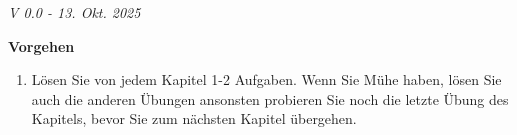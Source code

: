 

\renewcommand{\bbwAufgabenBlockID}{GLS}

\ifisNURAUFGABEN
\newcommand{\LoesungsBlock}[1]{\TRAINER{Lösung:#1
\vspace{1mm}
\hrule}}%
\else
\newcommand{\LoesungsBlock}[1]{\noTRAINER{\TNTeop{}}\TRAINER{Lösung:\,\,\,\,#1
\vspace{1mm}
\hrule}}%
\fi

\usepackage{amssymb} %
\renewcommand{\metaHeaderLine}{Arbeitsblatt Gleichungssysteme}
\renewcommand{\arbeitsblattTitel}{Lineare Gleichungssysteme}

\newcommand{\TNTeopS}[1]{\TRAINER{#1}\noTRAINER{\TNTeop{}}}

\arbeitsblattHeader{}

\begin{center}\textit{\tiny{V 0.0 - 13. Okt. 2025}}\end{center}

\tableofcontents{}

\newpage


\textbf{Vorgehen}


\begin{enumerate}
\item 
Lösen Sie von jedem Kapitel 1-2 Aufgaben. Wenn Sie Mühe haben, lösen
Sie auch die anderen Übungen ansonsten probieren Sie noch die letzte
Übung des Kapitels, bevor Sie zum nächsten Kapitel übergehen.
\end{enumerate}

\newpage

